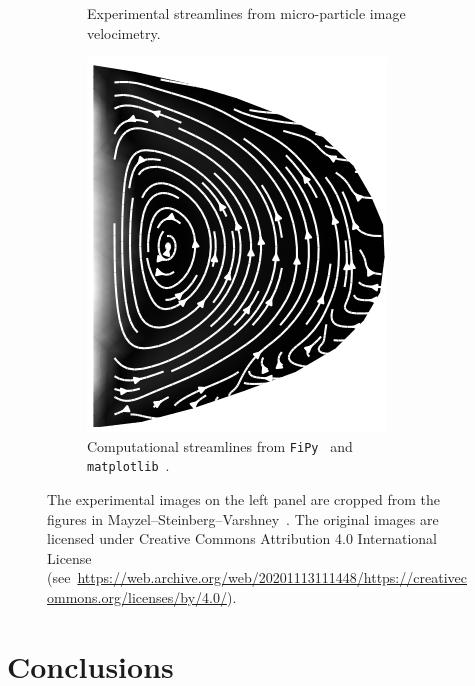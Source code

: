 \documentclass[11pt]{article}
\begin{document}
\begin{figure}[htbp]
\begin{subfigure}[b]{0.3\textwidth}
    \caption{Experimental streamlines from micro-particle image velocimetry. \cite{mayzel2019stokes}}
    \label{fig:velocimetry}
  \end{subfigure}
  \hspace{2cm}
  \begin{subfigure}[b]{0.3\textwidth}
    \centering
    \includegraphics[width=\textwidth]{./esimerkki_4.png}
    \caption{Computational streamlines from \texttt{FiPy}~\cite{FiPy2009} and \texttt{matplotlib}~\cite{hunter2007matplotlib}.}
    \label{fig:result}
  \end{subfigure}
  \hfill
\caption{
  The experimental images on
  the left panel are cropped from the figures in
  Mayzel--Steinberg--Varshney~\cite{mayzel2019stokes}. The original images are
  licensed under Creative Commons Attribution 4.0 International License
  (see~\url{https://web.archive.org/web/20201113111448/https://creativecommons.org/licenses/by/4.0/}).
}
\label{fig:esimerkki}
\end{figure}

\section{Conclusions}
\label{sec:org615e973}
\end{document}
